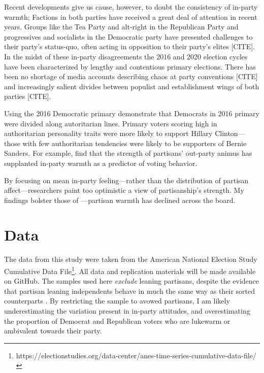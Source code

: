 \documentclass[12pt]{paper}
\begin{document}
Recent developments give us cause, however, to doubt the consistency of in-party warmth; Factions in both parties have received a great deal of attention in recent years. Groups like the Tea Party and alt-right in the Republican Party and progressives and socialists in the Democratic party have presented challenges to their party's status-quo, often acting in opposition to their party's elites [CITE]. In the midst of these in-party disagreements the 2016 and 2020 election cycles have been characterized by lengthy and contentious primary elections. There has been no shortage of media accounts describing chaos at party conventions [CITE] and increasingly salient divides between populist and establishment wings of both parties [CITE]. 

Using the 2016 Democratic primary \cite{wronski2018tale} demonstrate that Democrats in 2016 primary were divided along autoritarian lines. Primary voters scoring high in authoritarian personality traits were more likely to support Hillary Clinton---those with few authoritarian tendencies were likely to be supporters of Bernie Sanders. For example, \cite{iyengar2018strengthening} find that the strength of partisans' out-party animus has supplanted in-party warmth as a predictor of voting behavior. 



By focusing on mean in-party feeling---rather than the distribution of partisan affect---researchers paint too optimistic a view of partisanship's strength. My findings bolster those of  \cite{klar2018affective}---partisan warmth has declined across the board.




\section{Data}

The data from this study were taken from the American National Election Study Cumulative Data File\footnote{https://electionstudies.org/data-center/anes-time-series-cumulative-data-file/}. All data and replication materials will be made available on GitHub. The samples used here \textit{exclude} leaning partisans, despite the evidence that partisan leaning independents behave in much the same way as their sorted counterparts \citep{klar2016independent}. By restricting the sample to avowed partisans, I am likely underestimating the variation present in in-party attitudes, and overestimating the proportion of Democrat and Republican voters who are lukewarm or ambivalent towards their party. 
\end{document}
